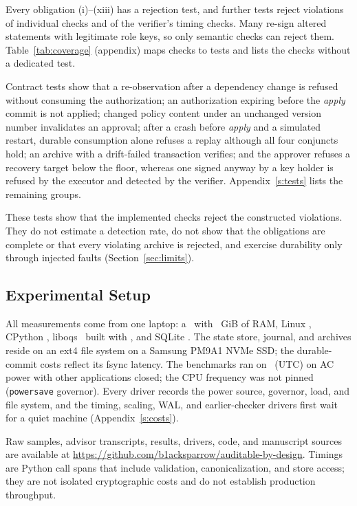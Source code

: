 \documentclass[journal]{IEEEtran}
\begin{document}
Every obligation (i)--(xiii) has a rejection test, and further tests reject violations of individual checks and of the verifier's timing checks. Many re-sign altered statements with legitimate role keys, so only semantic checks can reject them. Table~\ref{tab:coverage} (appendix) maps checks to tests and lists the checks without a dedicated test.

Contract tests show that a re-observation after a dependency change is refused without consuming the authorization; an authorization expiring before the \emph{apply} commit is not applied; changed policy content under an unchanged version number invalidates an approval; after a crash before \emph{apply} and a simulated restart, durable consumption alone refuses a replay although all four conjuncts hold; an archive with a drift-failed transaction verifies; and the approver refuses a recovery target below the floor, whereas one signed anyway by a key holder is refused by the executor and detected by the verifier. Appendix~\ref{s:tests} lists the remaining groups.

These tests show that the implemented checks reject the constructed violations. They do not estimate a detection rate, do not show that the obligations are complete or that every violating archive is rejected, and exercise durability only through injected faults (Section~\ref{sec:limits}).

\subsection{Experimental Setup}
All measurements come from one laptop: a \EnvCpu\ with \EnvMem~GiB of RAM, Linux \EnvKernel, CPython \EnvPython, liboqs \EnvLiboqs\ built with \EnvCompiler, and SQLite \EnvSqlite. The state store, journal, and archives reside on an ext4 file system on a Samsung PM9A1 NVMe SSD; the durable-commit costs reflect its fsync latency. The benchmarks ran on \EnvDate\ (UTC) on AC power with other applications closed; the CPU frequency was not pinned (\texttt{powersave} governor). Every driver records the power source, governor, load, and file system, and the timing, scaling, WAL, and earlier-checker drivers first wait for a quiet machine (Appendix~\ref{s:costs}).

Raw samples, advisor transcripts, results, drivers, code, and manuscript sources are available at \url{https://github.com/b1acksparrow/auditable-by-design}.
Timings are Python call spans that include validation, canonicalization, and store access; they are not isolated cryptographic costs and do not establish production throughput.
\end{document}
